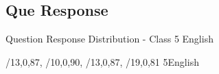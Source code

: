 \label{4.3 C5E Question Response Distribution}
\subsection{Que Response}
\renewcommand{\insertclass}{- Class 5}
\renewcommand{\insertsubject}{ - English}
\begin{frame}{Question Response Distribution - Class 5 English}
\vspace{-3mm}
\begin{minipage}{0.45\paperwidth}
{/{13,0,87},
/{10,0,90},
/{13,0,87},
/{19,0,81}}
{5}{English}
    \end{minipage}%
    \begin{minipage}{0.05\paperwidth}
        \hfill 
    \end{minipage}%
    \begin{minipage}{0.45\paperwidth}
    \queresponselegend
    \end{minipage}
\end{frame}
%



